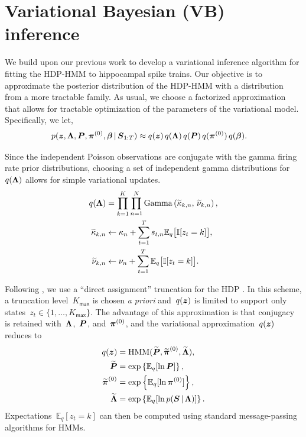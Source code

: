 \section{Variational Bayesian (VB) inference}



We build upon our previous work \citep{Chen12a,Chen14,Johnson14} to
develop a variational inference algorithm for fitting the HDP-HMM to
hippocampal spike trains. Our objective is to approximate the
posterior distribution of the HDP-HMM with a distribution from a more
tractable family. As usual, we choose a factorized approximation that
allows for tractable optimization of the parameters of the variational
model. Specifically, we let,
\begin{align*}
  p(\boldsymbol{z}, \boldsymbol{\Lambda}, \boldsymbol{P}, \boldsymbol{\pi}^{(0)}, \boldsymbol{\beta} \,|\, \boldsymbol{S}_{1:T}) 
  &\approx q(\boldsymbol{z}) \, q(\boldsymbol{\Lambda}) \, q(\boldsymbol{P}) \, q(\boldsymbol{\pi}^{(0)}) \, q(\boldsymbol{\beta}).
\end{align*}

Since the independent Poisson observations are conjugate with the
gamma firing rate prior distributions, choosing a set of independent
gamma distributions for~$q(\boldsymbol{\Lambda})$ allows for simple variational
updates.
\begin{align*}
  q(\boldsymbol{\Lambda}) &= \prod_{k=1}^K \prod_{n=1}^N \mathrm{Gamma}\left(\widetilde{\kappa}_{k,n},\, \widetilde{\nu}_{k,n} \right), \\
  \widetilde{\kappa}_{k,n} &\leftarrow \kappa_n + \sum_{t=1}^T s_{t,n} \mathbb{E}_q\big[\mathbb{I}[z_t=k]\big], \\
  \widetilde{\nu}_{k,n} &\leftarrow \nu_n + \sum_{t=1}^T \mathbb{E}_q\big[\mathbb{I}[z_t=k]\big].
\end{align*}

Following \citep{Johnson14}, we use a ``direct assignment'' truncation
for the HDP \citep{Bryant12, Liang07}. In this scheme, a truncation
level~$K_{\mathsf{max}}$ is chosen {\it a priori} and~$q(\boldsymbol{z})$ is limited to
support only states~${z_t\in\{1,\ldots, K_{\mathsf{max}}\}}$. The advantage of this
approximation is that conjugacy is retained with~$\boldsymbol{\Lambda}$,~$\boldsymbol{P}$,
and~$\boldsymbol{\pi}^{(0)}$, and the variational approximation~$q(\boldsymbol{z})$ reduces
to
\begin{align*}
q(\boldsymbol{z}) &= \mathrm{HMM}(\widetilde{\boldsymbol{P}}, \widetilde{\boldsymbol{\pi}}^{(0)}, \widetilde{\boldsymbol{\Lambda}}), \\
\widetilde{\boldsymbol{P}} &= \exp\left\{\mathbb{E}_q[\ln \boldsymbol{P}]\right\}, \\
\widetilde{\boldsymbol{\pi}}^{(0)} &= \exp\left\{\mathbb{E}_q[\ln \boldsymbol{\pi}^{(0)}]\right\}, \\
\widetilde{\boldsymbol{\Lambda}} &= \exp\left\{\mathbb{E}_q[\ln p(\boldsymbol{S} \,|\, \boldsymbol{\Lambda})]\right\}.
\end{align*}
Expectations~${\mathbb{E}_q[z_t=k]}$ can then be computed using
standard message-passing algorithms for HMMs.

